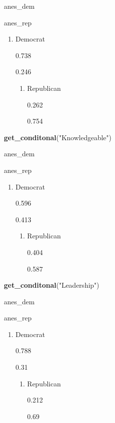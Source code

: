 \documentclass[
]{article}
\newenvironment{Shaded}{\begin{snugshade}}{\end{snugshade}}
\newcommand{\KeywordTok}[1]{\textcolor[rgb]{0.13,0.29,0.53}{\textbf{#1}}}
\newcommand{\NormalTok}[1]{#1}
\newcommand{\StringTok}[1]{\textcolor[rgb]{0.31,0.60,0.02}{#1}}
\providecommand{\tightlist}{%
  \setlength{\itemsep}{0pt}\setlength{\parskip}{0pt}}
\begin{document}
anes\_dem

anes\_rep

\begin{enumerate}
\def\labelenumi{\arabic{enumi}.}
\tightlist
\item
  Democrat

  {0.738}

  {0.246}

  \begin{enumerate}
  \def\labelenumii{\arabic{enumii}.}
  \setcounter{enumii}{1}
  \tightlist
  \item
    Republican

    {0.262}

    {0.754}
  \end{enumerate}
\end{enumerate}

\begin{Shaded}
\begin{Highlighting}[]
\KeywordTok{get_conditonal}\NormalTok{(}\StringTok{"Knowledgeable"}\NormalTok{)}
\end{Highlighting}
\end{Shaded}

anes\_dem

anes\_rep

\begin{enumerate}
\def\labelenumi{\arabic{enumi}.}
\tightlist
\item
  Democrat

  {0.596}

  {0.413}

  \begin{enumerate}
  \def\labelenumii{\arabic{enumii}.}
  \setcounter{enumii}{1}
  \tightlist
  \item
    Republican

    {0.404}

    {0.587}
  \end{enumerate}
\end{enumerate}

\begin{Shaded}
\begin{Highlighting}[]
\KeywordTok{get_conditonal}\NormalTok{(}\StringTok{"Leadership"}\NormalTok{)}
\end{Highlighting}
\end{Shaded}

anes\_dem

anes\_rep

\begin{enumerate}
\def\labelenumi{\arabic{enumi}.}
\tightlist
\item
  Democrat

  {0.788}

  {0.31}

  \begin{enumerate}
  \def\labelenumii{\arabic{enumii}.}
  \setcounter{enumii}{1}
  \tightlist
  \item
    Republican

    {0.212}

    {0.69}
  \end{enumerate}
\end{enumerate}
\end{document}

